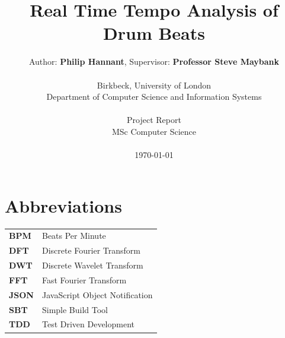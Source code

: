 \documentclass[a4paper, 11pt]{article}
\date{}
\begin{document}
 

\LARGE\title{Real Time Tempo Analysis of Drum Beats}

\LARGE\author{Author: \textbf{Philip Hannant}, Supervisor: \textbf{Professor Steve Maybank}\\
\\Birkbeck, University of London\\
Department of Computer Science and Information Systems\\
\\Project Report\\
MSc Computer Science\\
\\\monthyeardate\today
}





\normalsize


\maketitle
\newpage
\tableofcontents
\clearpage

\section*{Abbreviations}
\begin{tabular}{l p{4.5in}  }\\
\textbf{BPM} & Beats Per Minute\\
\textbf{DFT} & Discrete Fourier Transform\\
\textbf{DWT} & Discrete Wavelet Transform\\
\textbf{FFT} & Fast Fourier Transform\\
\textbf{JSON} & JavaScript Object Notification\\
\textbf{SBT} & Simple Build Tool\\
\textbf{TDD} & Test Driven Development\\
\end{tabular}
\end{document}
